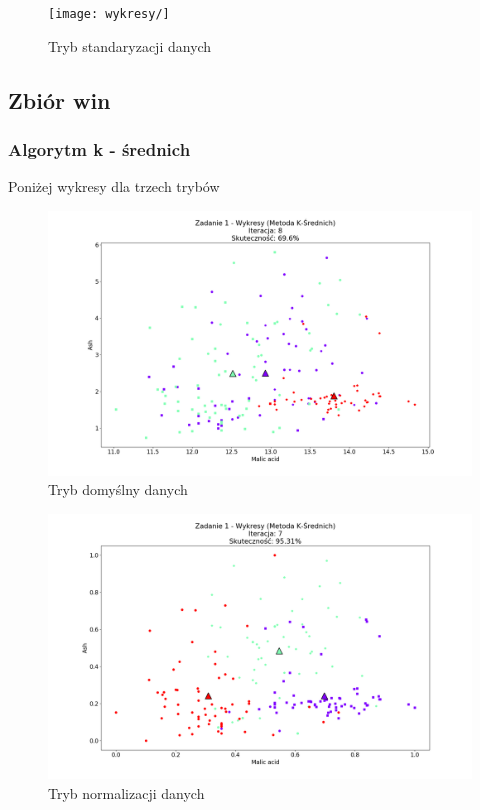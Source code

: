 \documentclass{classrep}
\begin{document}
{{{				\begin{figure}[!htbp]
					\texttt{[image: wykresy/]}
					\caption{Tryb standaryzacji danych}
				\end{figure}
			\FloatBarrier
		\fi
		}
	}
	\subsection{Zbiór win}
	{
		\subsubsection{Algorytm k - średnich}
		{
			Poniżej wykresy dla trzech trybów
				\begin{figure}[!htbp]
					\includegraphics[width=\textwidth]{wykresy/plot_k_meansWineDefault.png}
					\caption{Tryb domyślny danych}
				\end{figure}
			
				\begin{figure}[!htbp]
					\includegraphics[width=\textwidth]{wykresy/plot_k_meansWineNormalised.png}
					\caption{Tryb normalizacji danych}
				\end{figure}
		
}}}
\end{document}

